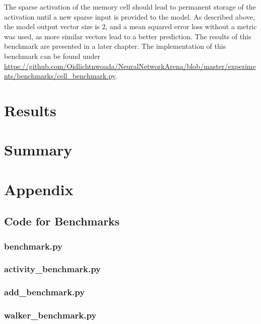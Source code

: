 \documentclass[draft,final]{vutinfth} %
\begin{document}
    The sparse activation of the memory cell should lead to permanent storage of the activation until a new sparse input is provided to the model.
    As described above, the model output vector size is $2$, and a mean squared error loss without a metric was used, as more similar vectors lead to a better prediction.
    The results of this benchmark are presented in a later chapter.
    The implementation of this benchmark can be found under \url{https://github.com/Oidlichtnwoada/NeuralNetworkArena/blob/master/experiments/benchmarks/cell_benchmark.py}.


    \chapter{Results}


    \chapter{Summary}


    \chapter{Appendix}


    \section{Code for Benchmarks}

    \subsection{benchmark.py}
    

    \subsection{activity\_benchmark.py}
    

    \subsection{add\_benchmark.py}
    

    \subsection{walker\_benchmark.py}
    
\end{document}
